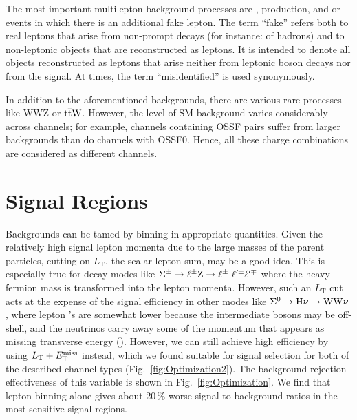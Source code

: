 The most important multilepton background processes are \WZ, \ZZ production, and \Z or \ttbar events in which there is an additional fake lepton. The term ``fake'' refers both to real leptons that arise from non-prompt decays (for instance: of hadrons) and to non-leptonic objects that are reconstructed as leptons. It is intended to denote all objects reconstructed as leptons that arise neither from leptonic boson decays nor from the signal. At times, the term ``misidentified'' is used synonymously.

In addition to the aforementioned backgrounds, there are various rare processes like WWZ or $\mathrm{t}\overline{\mathrm{t}}\mathrm{W}$. However, the level of SM background varies considerably across channels; for example, channels containing OSSF pairs suffer from larger backgrounds than do channels with OSSF0. Hence, all these charge combinations are considered as different channels.


\section{Signal Regions}
\label{sec:Optimization}


Backgrounds can be tamed by binning in appropriate quantities. Given the relatively high signal lepton momenta due to the large masses of the parent particles, cutting on $L_\textrm{T}$, the scalar lepton \pt sum, may be a good idea. This is especially true for decay modes like $\Sigma^\pm \to \ell^\pm \mathrm{Z} \to \ell^\pm ~ \ell^{\prime \pm} \ell^{\prime \mp}$ where the heavy fermion mass is transformed into the lepton momenta. However, such an $L_\textrm{T}$ cut acts at the expense of the signal efficiency in other modes like $\Sigma^0 \to \mathrm{H} \nu \to \mathrm{W}\mathrm{W}\nu$, where lepton \pt's are somewhat lower because the intermediate bosons may be off-shell, and the neutrinos carry away some of the momentum that appears as missing transverse energy (\MET). However, we can still achieve high efficiency by using $L_\textrm{T} + E_{\mathrm{T}}^{\text{miss}}$ instead, which we found suitable for signal selection for both of the described channel types (Fig.~\ref{fig:Optimization2}). The background rejection effectiveness of this variable is shown in Fig.~\ref{fig:Optimization}. We find that lepton \pt binning alone gives about 20\,\% worse signal-to-background ratios in the most sensitive signal regions.

